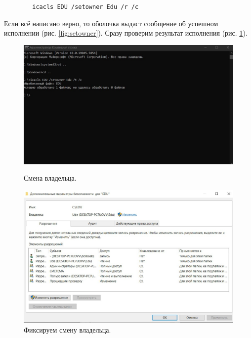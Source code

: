 \begin{verbatim}
        icacls EDU /setowner Edu /r /c
\end{verbatim}

Если всё написано верно, то оболочка выдаст сообщение об успешном исполнении (рис. \ref{fig:setowner}). Сразу проверим результат исполнения (рис. \ref{fig:checkchown}). 

\begin{figure}[h!]
    \centering
    \begin{minipage}[p]{0.45\linewidth}
    \centering
    \includegraphics[width=1\linewidth]{Pic/lab2/photo_2025-05-21_21-18-53.jpg}
    \caption{Смена владельца.}
    \label{fig:setowner}
    \end{minipage}
    \hfill
    \begin{minipage}[p]{0.45\linewidth}
    \centering
    \includegraphics[width=1\linewidth]{Pic/lab2/photo_2025-05-21_21-18-54.jpg}
    \caption{Фиксируем смену владельца.}
    \label{fig:checkchown}
    \end{minipage}
\end{figure}

